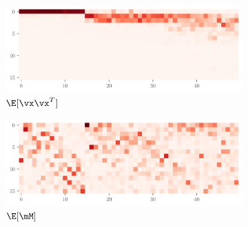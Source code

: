 \begin{figure}[ht]
    \centering
    \begin{subfigure}[t]{0.46\textwidth}
        \centering
        \captionsetup{justification=centering}
        \includegraphics[width=\textwidth]{Figures/Correspondence/LeNet5_fixlr0.01/Conv/xxT_Trueest_real_corr_expand_t50_CIFAR10_Exp1_LeNet5_fixlr0.01_E-1_conv2.pdf}
        \caption{$\E[\vx\vx^T]$}
        \label{fig:Corr_xxT_True_conv}
    \end{subfigure}
    \begin{subfigure}[t]{0.46\textwidth}
        \centering
        \captionsetup{justification=centering}
        \includegraphics[width=\textwidth]{Figures/Correspondence/LeNet5_fixlr0.01/Conv/UTAU_Trueest_real_corr_expand_t50_CIFAR10_Exp1_LeNet5_fixlr0.01_E-1_conv2.pdf}
        \caption{$\E[\mM]$}
        \label{fig:Corr_UTAU_True_conv}
    \end{subfigure}
    \begin{subfigure}[t]{0.04\textwidth}
        \centering

\end{subfigure}
\end{figure}
